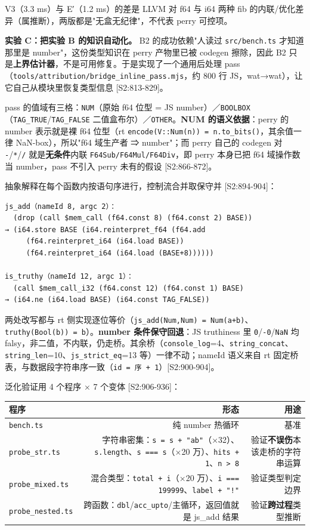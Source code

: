\documentclass[11pt, a4paper]{article}
\begin{document}
V3（3.3 ms）与 E′（1.2 ms）的差是 LLVM 对 f64 与 i64 两种 fib 的内联/优化差异（属推断），两版都是"无盒无纪律"，不代表 perry 可控项。


\textbf{实验 C：把实验 B 的知识自动化。} B2 的成功依赖"人读过 \texttt{src/bench.ts} 才知道那里是 number"，这份类型知识在 perry 产物里已被 codegen 擦除，因此 B2 只是\textbf{上界估计器}，不是可用修复。于是实现了一个通用后处理 pass（\texttt{tools/attribution/bridge\_inline\_pass.mjs}，约 800 行 JS，wat→wat），让它自己从模块里恢复类型信息 [S2:813-829]。


pass 的值域有三格：\texttt{NUM}（原始 f64 位型 = JS number）／\texttt{BOOLBOX}（\texttt{TAG\_TRUE}/\texttt{TAG\_FALSE} 二值盒布尔）／\texttt{OTHER}。\textbf{NUM 的语义依据}：perry 的 number 表示就是裸 f64 位型（rt \texttt{encode(V::Num(n)) = n.to\_bits()}，其余值一律 NaN-box），所以"f64 域生产者 ⇒ number"；而 perry 自己的 codegen 对 \texttt{-}/\texttt{*}/\texttt{/} 就是\textbf{无条件}内联 \texttt{F64Sub/F64Mul/F64Div}，即 perry 本身已把 f64 域操作数当 number，pass 不引入 perry 未有的假设 [S2:866-872]。


抽象解释在每个函数内按语句序进行，控制流合并取保守并 [S2:894-904]：


\begin{verbatim}
js_add（nameId 8, argc 2）：
  (drop (call $mem_call (f64.const 8) (f64.const 2) BASE))
→ (i64.store BASE (i64.reinterpret_f64 (f64.add
     (f64.reinterpret_i64 (i64.load BASE))
     (f64.reinterpret_i64 (i64.load (BASE+8))))))

is_truthy（nameId 12, argc 1）：
  (call $mem_call_i32 (f64.const 12) (f64.const 1) BASE)
→ (i64.ne (i64.load BASE) (i64.const TAG_FALSE))
\end{verbatim}

两处改写都与 rt 侧实现逐位等价（\texttt{js\_add(Num,Num) = Num(a+b)}、\texttt{truthy(Bool(b)) = b}）。\textbf{number 条件保守回退}：JS truthiness 里 \texttt{0}/\texttt{-0}/\texttt{NaN} 均 falsy，非二值，不内联，仍走桥。其余桥（\texttt{console\_log}=4、\texttt{string\_concat}、\texttt{string\_len}=10、\texttt{js\_strict\_eq}=13 等）一律不动；nameId 语义来自 rt 固定桥表，与数据段字符串序一致（\texttt{id = 序 + 1}）[S2:900-904]。


泛化验证用 4 个程序 × 7 个变体 [S2:906-936]：


\begin{center}\small\begin{tabular}{lrr}
\toprule
程序 & 形态 & 用途 \\
\midrule
\texttt{bench.ts} & 纯 number 热循环 & 基准 \\
\texttt{probe\_str.ts} & 字符串密集：\texttt{s = s + "ab"}（×32）、\texttt{s.length}、\texttt{s === s}（×20 万）、\texttt{hits + 1}、\texttt{n > 8} & 验证\textbf{不误伤}本该走桥的字符串运算 \\
\texttt{probe\_mixed.ts} & 混合类型：\texttt{total + i}（×20 万）、\texttt{i === 199999}、\texttt{label + "!"} & 验证类型判定边界 \\
\texttt{probe\_nested.ts} & 跨函数：\texttt{dbl}/\texttt{acc\_upto}/主循环，返回值就是 js\_add 结果 & 验证\textbf{跨过程}类型推断 \\
\bottomrule
\end{tabular}\end{center}
\end{document}

